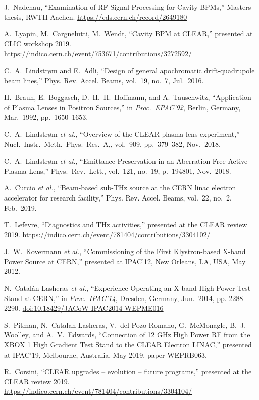 \documentclass[a4paper,
               keeplastbox,   %
               ]{jacow}
\begin{document}
\begin{thebibliography}{99}
 J.\ Nadenau, “Examination of RF Signal Processing for Cavity BPMs,” Masters thesis, RWTH Aachen. \url{https://cds.cern.ch/record/2649180}

 A.\ Lyapin, M.\ Cargnelutti, M.\ Wendt, “Cavity BPM at CLEAR,” presented at CLIC workshop 2019. \url{https://indico.cern.ch/event/753671/contributions/3272592/}

 C.\ A.\ Lindstrøm and E.\ Adli, “Design of general apochromatic drift-quadrupole beam lines,” Phys. Rev. Accel. Beams, vol.\ 19, no.\ 7, Jul.\ 2016.


 H.\ Braun, E.\ Boggasch, D.\ H.\ H.\ Hoffmann, and A.\ Tauschwitz, “Application of Plasma Lenses in Positron Sources,” in \emph{Proc.\ EPAC'92}, Berlin, Germany, Mar.\ 1992, pp.\ 1650--1653.


 C.\ A.\ Lindstrøm \emph{et al.}, “Overview of the CLEAR plasma lens experiment,” Nucl.\ Instr.\ Meth.\ Phys.\ Res.\ A,, vol.\ 909, pp.\ 379--382, Nov.\ 2018.

 C.\ A.\ Lindstrøm \emph{et al.}, “Emittance Preservation in an Aberration-Free Active Plasma Lens,” Phys.\ Rev.\ Lett., vol.\ 121, no.\ 19, p.\ 194801, Nov.\ 2018.

 A.\ Curcio \emph{et al.}, “Beam-based sub-THz source at the CERN linac electron accelerator for research facility,” Phys. Rev. Accel. Beams, vol.\ 22, no.\ 2, Feb.\ 2019.

 T.\ Lefevre, “Diagnostics and THz activities,” presented at the CLEAR review 2019. \url{https://indico.cern.ch/event/781404/contributions/3304102/}

 J.\ W.\ Kovermann \emph{et al.}, “Commissioning of the First Klystron-based X-band Power Source at CERN,” presented at IPAC’12, New Orleans, LA, USA, May 2012.

 N.\ Catalán Lasheras \emph{et al.}, “Experience Operating an X-band High-Power Test Stand at CERN,” in \emph{Proc.\ IPAC'14}, Dresden, Germany, Jun.\ 2014, pp. 2288--2290. \url{doi:10.18429/JACoW-IPAC2014-WEPME016}

   S.\ Pitman, N.\ Catalan-Lasheras, V.\ del Pozo Romano, G.\ McMonagle, B.\ J. Woolley, and A.\ V.\ Edwards,
   “Connection of 12 GHz High Power RF from the XBOX 1 High Gradient Test Stand to the CLEAR Electron LINAC,”
   presented at IPAC'19, Melbourne, Australia, May 2019, paper WEPRB063.

 R.\ Corsini, “CLEAR upgrades -- evolution -- future programs,” presented at the CLEAR review 2019. \url{https://indico.cern.ch/event/781404/contributions/3304104/}

\end{thebibliography}
\end{document}
